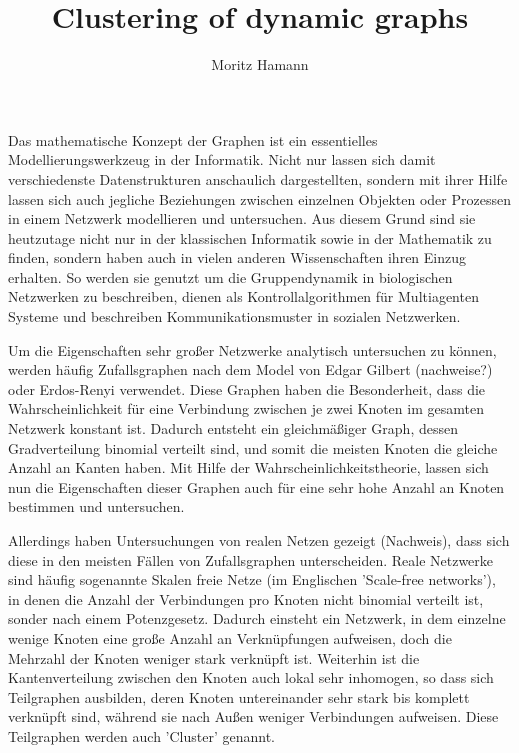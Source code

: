 \documentclass[journal]{vgtc}
\author{Moritz Hamann}
\title{Clustering of dynamic graphs}
\begin{document}

\maketitle

  Das mathematische Konzept der Graphen ist ein essentielles 
  Modellierungswerkzeug in der Informatik. Nicht nur lassen sich damit
  verschiedenste Datenstrukturen anschaulich dargestellten, sondern
  mit ihrer Hilfe lassen sich auch jegliche Beziehungen zwischen einzelnen
  Objekten oder Prozessen in einem Netzwerk modellieren und untersuchen.
  Aus diesem Grund sind sie heutzutage nicht nur in der klassischen Informatik
  sowie in der Mathematik zu finden, sondern haben auch in vielen anderen
  Wissenschaften ihren Einzug erhalten. So werden sie genutzt um die
  Gruppendynamik in biologischen Netzwerken zu beschreiben, dienen
  als Kontrollalgorithmen für Multiagenten Systeme \cite{graphcontrol} und beschreiben
  Kommunikationsmuster in sozialen Netzwerken.
  
  Um die Eigenschaften sehr großer Netzwerke analytisch untersuchen zu können,
  werden häufig Zufallsgraphen nach dem Model von Edgar Gilbert (nachweise?) oder
  Erdos-Renyi verwendet. Diese Graphen haben die Besonderheit, dass die 
  Wahrscheinlichkeit für eine Verbindung zwischen je zwei Knoten im 
  gesamten Netzwerk konstant ist. Dadurch entsteht ein gleichmäßiger Graph,
  dessen Gradverteilung binomial verteilt sind, und somit die meisten Knoten 
  die gleiche Anzahl an Kanten haben. Mit Hilfe der Wahrscheinlichkeitstheorie,
  lassen sich nun die Eigenschaften dieser Graphen auch für eine sehr hohe Anzahl
  an Knoten bestimmen und untersuchen.
  
  Allerdings haben Untersuchungen von realen Netzen gezeigt (Nachweis), dass sich
  diese in den meisten Fällen von Zufallsgraphen unterscheiden. Reale Netzwerke sind
  häufig sogenannte Skalen freie Netze (im Englischen 'Scale-free networks'), in 
  denen die Anzahl der Verbindungen pro Knoten nicht binomial verteilt ist, sonder nach einem
  Potenzgesetz. Dadurch einsteht ein Netzwerk, in dem einzelne wenige Knoten eine große
  Anzahl an Verknüpfungen aufweisen, doch die Mehrzahl der Knoten weniger stark verknüpft ist. 
  Weiterhin ist die Kantenverteilung zwischen den Knoten auch lokal sehr inhomogen, so dass sich 
  Teilgraphen ausbilden, deren Knoten untereinander sehr stark bis komplett verknüpft sind,
  während sie nach Außen weniger Verbindungen aufweisen. Diese Teilgraphen werden auch 'Cluster' genannt.
\end{document}
